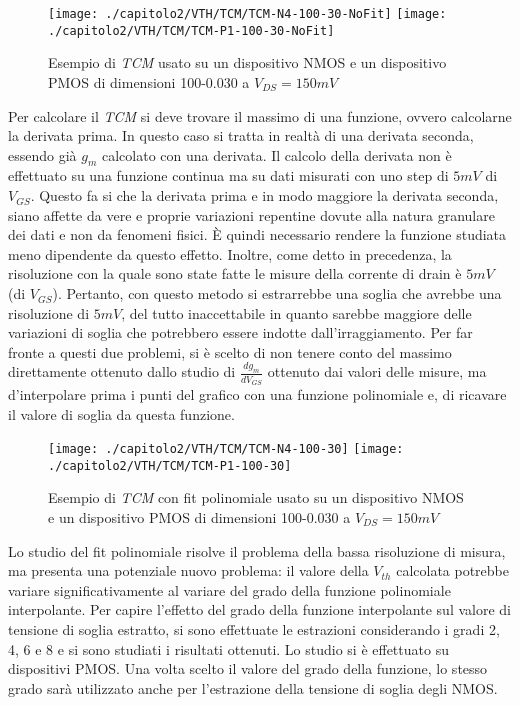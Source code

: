 \begin{figure}[h!]
  \centering
  \texttt{[image: ./capitolo2/VTH/TCM/TCM-N4-100-30-NoFit]}
  \texttt{[image: ./capitolo2/VTH/TCM/TCM-P1-100-30-NoFit]}
  \caption[Applicazione TCM senza fit polinomiale]{Esempio di \emph{TCM} usato su un dispositivo NMOS e un dispositivo PMOS di dimensioni 100-0.030 a $V_{DS} = 150 mV$}
\end{figure}

Per calcolare il \emph{TCM} si deve trovare il massimo di una funzione, ovvero calcolarne la derivata prima. In questo caso si tratta in realtà di una derivata seconda, essendo già $g_m$ calcolato con una derivata. Il calcolo della derivata non è effettuato su una funzione continua ma su dati misurati con uno step di $5mV$ di $V_{GS}$. Questo fa si che la derivata prima e in modo maggiore la derivata seconda, siano affette da vere e proprie variazioni repentine dovute alla natura granulare dei dati e non da fenomeni fisici. È quindi necessario rendere la funzione studiata meno dipendente da questo effetto. Inoltre, come detto in precedenza, la risoluzione con la quale sono state fatte le misure della corrente di drain è $5mV$ (di $V_{GS}$). Pertanto, con questo metodo si estrarrebbe una soglia che avrebbe una risoluzione di $5mV$, del tutto inaccettabile in quanto sarebbe maggiore delle variazioni di soglia che potrebbero essere indotte dall'irraggiamento.
Per far fronte a questi due problemi, si è scelto di non tenere conto del massimo direttamente ottenuto dallo studio di $\frac{dg_m}{dV_{GS}}$ ottenuto dai valori delle misure, ma d'interpolare prima i punti del grafico con una funzione polinomiale e, di ricavare il valore di soglia da questa funzione.

\begin{figure}[H]
  \centering
  \texttt{[image: ./capitolo2/VTH/TCM/TCM-N4-100-30]}
  \texttt{[image: ./capitolo2/VTH/TCM/TCM-P1-100-30]}
  \caption[Applicazione TCM con fit polinomiale di sesto grado]{Esempio di \emph{TCM} con fit polinomiale usato su un dispositivo NMOS e un dispositivo PMOS di dimensioni 100-0.030 a $V_{DS} = 150 mV$}
\end{figure}

Lo studio del fit polinomiale risolve il problema della bassa risoluzione di misura, ma presenta una potenziale nuovo problema: il valore della $V_{th}$ calcolata potrebbe variare significativamente al variare del grado della funzione polinomiale interpolante. Per capire l'effetto del grado della funzione interpolante sul valore di tensione di soglia estratto, si sono effettuate le estrazioni considerando i gradi 2, 4, 6 e 8 e si sono studiati i risultati ottenuti. Lo studio si è effettuato su dispositivi PMOS. Una volta scelto il valore del grado della funzione, lo stesso grado sarà utilizzato anche per l'estrazione della tensione di soglia degli NMOS.


